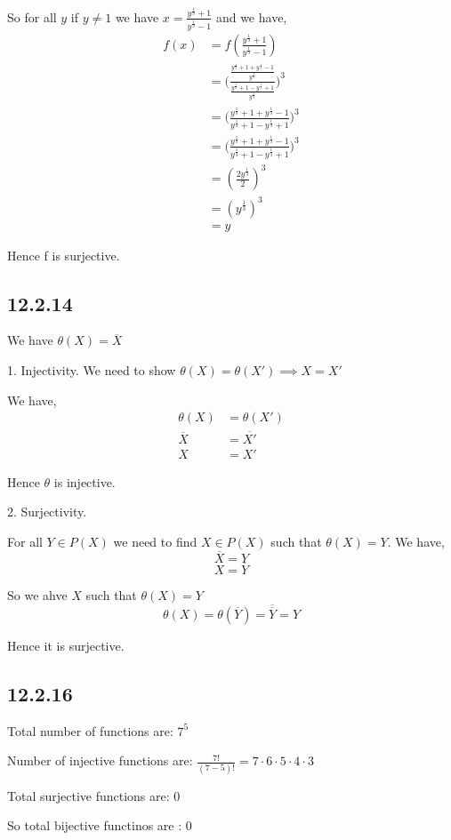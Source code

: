 \documentclass[a4paper]{report}
\begin{document}
So for all $y$ if $y\ne 1$ we have $x = \frac{y^{\frac{1}{3}} + 1}{y^{\frac{1}{3}}-1}$ and we have, 
\begin{align*}
    f(x) &= f(  \frac{y^{\frac{1}{3}} + 1}{y^{\frac{1}{3}}-1})\\
         &= \bigg (\frac{\frac{y^{\frac{1}{3}} + 1 + y^{\frac{1}{3}} - 1}{y^{\frac{1}{3}}}}{\frac{y^{\frac{1}{3}}+ 1 - y^{\frac{1}{3}} + 1}{y^{\frac{1}{3}}}}\bigg )^{3}\\
         &= \bigg (\frac{y^{\frac{1}{3}} + 1 + y^{\frac{1}{3}} - 1}{y^{\frac{1}{3}}+ 1 - y^{\frac{1}{3}} + 1}\bigg )^{3}\\
         &= \bigg (\frac{y^{\frac{1}{3}} + 1 + y^{\frac{1}{3}} - 1}{y^{\frac{1}{3}}+ 1 - y^{\frac{1}{3}} + 1}\bigg )^{3}\\
         &= (\frac{2y^{\frac{1}{3}}}{2})^{3}\\
         &= (y^{\frac{1}{3}})^{3}\\
         &= y
\end{align*}


Hence f is surjective.


\subsection*{12.2.14}
We have $\theta(X) = \overline{X}$

1. Injectivity. We need to show $\theta(X) = \theta(X') \implies X = X'$

We have,  
\begin{align*}
    \theta(X) &= \theta(X')\\
    \overline{X} &= \overline{X'}\\
    X &= X'
\end{align*}

Hence $\theta$ is injective.

2. Surjectivity.

For all  $Y \in P(X)$ we need to find $X \in P(X)$ such that $\theta(X) = Y $. We have,  
$$ \overline{X} = Y $$ 
$$ X = \overline{Y} $$ 

So we ahve $X$ such that $\theta(X) = Y$
$$ \theta(X) = \theta(\overline{Y}) = \overline{\overline{Y}}  = Y$$ 

Hence it is surjective.


\subsection*{12.2.16}
Total number of functions are: $7^{5}$

Number of injective functions are: $\frac{7!}{(7 - 5)!} = 7 \cdot 6 \cdot 5 \cdot 4 \cdot 3$

Total surjective functions are: 0 

So total bijective functinos are : 0






 
\end{document}
